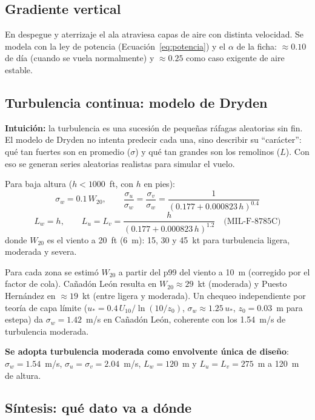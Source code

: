 \documentclass[11pt]{article}
\begin{document}
\subsection{Gradiente vertical}

En despegue y aterrizaje el ala atraviesa capas de aire con distinta
velocidad. Se modela con la ley de potencia (Ecuación~\ref{eq:potencia}) y el
$\alpha$ de la ficha: $\approx0.10$ de día (cuando se vuela normalmente) y
$\approx0.25$ como caso exigente de aire estable.

\subsection{Turbulencia continua: modelo de Dryden}
\label{sec:dryden}

\textbf{Intuición:} la turbulencia es una sucesión de pequeñas ráfagas
aleatorias sin fin. El modelo de Dryden no intenta predecir cada una, sino
describir su ``carácter'': qué tan fuertes son en promedio ($\sigma$) y qué
tan grandes son los remolinos ($L$). Con eso se generan series aleatorias
realistas para simular el vuelo.

Para baja altura ($h<1000$~ft, con $h$ en pies):
\begin{equation}
\sigma_w = 0.1\,W_{20},\qquad
\frac{\sigma_u}{\sigma_w}=\frac{\sigma_v}{\sigma_w}=\frac{1}{(0.177+0.000823\,h)^{0.4}}
\end{equation}
\begin{equation}
L_w = h,\qquad L_u = L_v = \frac{h}{(0.177+0.000823\,h)^{1.2}}
\quad\text{(MIL-F-8785C)}
\end{equation}
donde $W_{20}$ es el viento a 20~ft (6~m): 15, 30 y 45~kt para turbulencia
ligera, moderada y severa.

Para cada zona se estimó $W_{20}$ a partir del p99 del viento a 10~m
(corregido por el factor de cola). Cañadón León resulta en $W_{20}\approx29$~kt
(moderada) y Puesto Hernández en $\approx19$~kt (entre ligera y moderada). Un
chequeo independiente por teoría de capa límite
($u_*=0.4\,U_{10}/\ln(10/z_0)$, $\sigma_w\approx1.25\,u_*$, $z_0=0.03$~m para
estepa) da $\sigma_w=1.42$~m/s en Cañadón León, coherente con los
1.54~m/s de turbulencia moderada.

\textbf{Se adopta turbulencia moderada como envolvente única de diseño}:
$\sigma_w=1.54$~m/s, $\sigma_u=\sigma_v=2.04$~m/s, $L_w=120$~m y
$L_u=L_v=275$~m a 120~m de altura.

\subsection{Síntesis: qué dato va a dónde}
\end{document}
